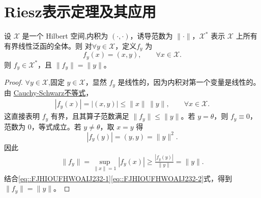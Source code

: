 \documentclass[../../main.tex]{subfiles}%
\begin{document}
\section{Riesz表示定理及其应用}

\begin{theorem}
设 $\mathscr{X}$ 是一个 Hilbert 空间,内积为 $(\cdot,\cdot)$，诱导范数为 $\|\cdot\|$，$\mathscr{X}^*$ 表示 $\mathscr{X}$ 上所有有界线性泛函的全体。则
对$\forall y\in\mathscr{X}$，定义$f_y$ 为
\[
f_y(x) = (x,y), \qquad \forall x\in\mathscr{X}.
\]
则 $f_y\in\mathscr{X}^*$，且 $\|f_y\| = \|y\|$。
\end{theorem}
\begin{proof}

$\forall y\in \mathscr{X}$,固定 $y\in\mathscr{X}$，显然 $f_y$ 是线性的，因为内积对第一个变量是线性的。由 \hyperref[theorem:泛函分析--Cauchy-Schwarz不等式]{Cauchy-Schwarz不等式}，
\begin{align}
|f_y(x)| = |(x,y)| \leqslant \|x\|\,\|y\|, \qquad \forall x\in\mathscr{X}.\label{eq::FJHIOUFHWOAIJ232-1}
\end{align}
这直接表明 $f_y$ 有界，且其算子范数满足 $\|f_y\| \leqslant \|y\|$。若 $y=\theta$，则 $f_y\equiv 0$，范数为 $0$，等式成立。若 $y\neq\theta$，取 $x=y$ 得
\[
|f_y(y)| = (y,y) = \|y\|^2.
\]
因此
\begin{align}
\|f_y\| = \sup_{\|x\|=1}|f_y(x)| \geqslant \frac{|f_y(y)|}{\|y\|} = \|y\|.\label{eq::FJHIOUFHWOAIJ232-2}
\end{align}
结合\eqref{eq::FJHIOUFHWOAIJ232-1}\eqref{eq::FJHIOUFHWOAIJ232-2}式，得到 $\|f_y\| = \|y\|$。
\end{proof}
\end{document}
